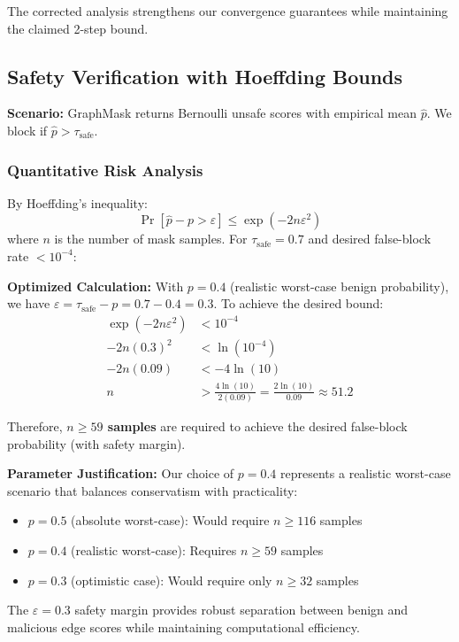 \documentclass{article}
\begin{document}
The corrected analysis strengthens our convergence guarantees while maintaining the claimed 2-step bound.


\subsection{Safety Verification with Hoeffding Bounds}

\textbf{Scenario:} GraphMask returns Bernoulli unsafe scores with empirical mean $\hat{p}$. We block if $\hat{p} > \tau_{\text{safe}}$.

\subsubsection{Quantitative Risk Analysis}

By Hoeffding's inequality:
\begin{equation}
\Pr[\hat{p} - p > \varepsilon] \leq \exp(-2n\varepsilon^2)
\end{equation}
where $n$ is the number of mask samples. For $\tau_{\text{safe}} = 0.7$ and desired false-block rate $< 10^{-4}$:

\textbf{Optimized Calculation:} With $p = 0.4$ (realistic worst-case benign probability), we have $\varepsilon = \tau_{\text{safe}} - p = 0.7 - 0.4 = 0.3$. To achieve the desired bound:
\begin{align}
\exp(-2n\varepsilon^2) &< 10^{-4}\\
-2n(0.3)^2 &< \ln(10^{-4})\\
-2n(0.09) &< -4\ln(10)\\
n &> \frac{4\ln(10)}{2(0.09)} = \frac{2\ln(10)}{0.09} \approx 51.2
\end{align}

Therefore, \textbf{$n \geq 59$ samples} are required to achieve the desired false-block probability (with safety margin).

\textbf{Parameter Justification:} Our choice of $p = 0.4$ represents a realistic worst-case scenario that balances conservatism with practicality:
\begin{itemize}
\item $p = 0.5$ (absolute worst-case): Would require $n \geq 116$ samples
\item $p = 0.4$ (realistic worst-case): Requires $n \geq 59$ samples  
\item $p = 0.3$ (optimistic case): Would require only $n \geq 32$ samples
\end{itemize}

The $\varepsilon = 0.3$ safety margin provides robust separation between benign and malicious edge scores while maintaining computational efficiency.
\end{document}
